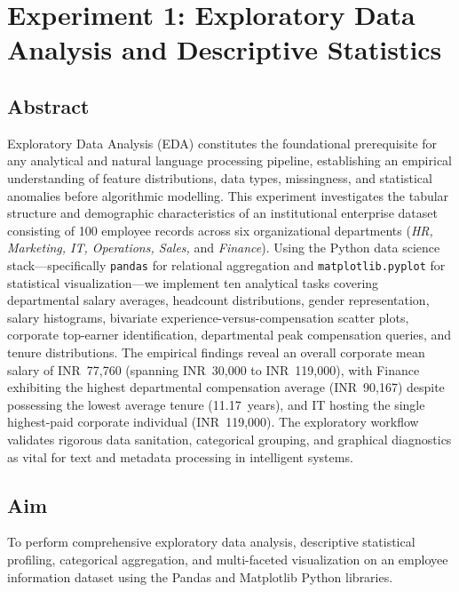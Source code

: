 \documentclass[12pt,a4paper]{report}
\begin{document}
\chapter{Experiment 1: Exploratory Data Analysis and Descriptive Statistics}
\label{chap:exp1}

\section{Abstract}
Exploratory Data Analysis (EDA) constitutes the foundational prerequisite for any analytical and natural language processing pipeline, establishing an empirical understanding of feature distributions, data types, missingness, and statistical anomalies before algorithmic modelling. This experiment investigates the tabular structure and demographic characteristics of an institutional enterprise dataset consisting of 100 employee records across six organizational departments (\textit{HR, Marketing, IT, Operations, Sales,} and \textit{Finance}). Using the Python data science stack---specifically \texttt{pandas} for relational aggregation and \texttt{matplotlib.pyplot} for statistical visualization---we implement ten analytical tasks covering departmental salary averages, headcount distributions, gender representation, salary histograms, bivariate experience-versus-compensation scatter plots, corporate top-earner identification, departmental peak compensation queries, and tenure distributions. The empirical findings reveal an overall corporate mean salary of INR~77,760 (spanning INR~30,000 to INR~119,000), with Finance exhibiting the highest departmental compensation average (INR~90,167) despite possessing the lowest average tenure (11.17~years), and IT hosting the single highest-paid corporate individual (INR~119,000). The exploratory workflow validates rigorous data sanitation, categorical grouping, and graphical diagnostics as vital for text and metadata processing in intelligent systems.

\section{Aim}
To perform comprehensive exploratory data analysis, descriptive statistical profiling, categorical aggregation, and multi-faceted visualization on an employee information dataset using the Pandas and Matplotlib Python libraries.
\end{document}
